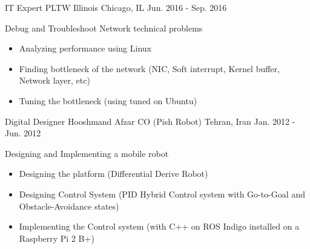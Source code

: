 

\begin{cventries}

  \cventry
    {IT Expert} %
    {PLTW Illinois} %
    {Chicago, IL} %
    {Jun. 2016 - Sep. 2016} %
    {
      \begin{cvitems} %
        \item Debug and Troubleshoot Network technical problems
        \begin{itemize}
        		\item Analyzing performance using Linux
        		\item Finding bottleneck of the network (NIC, Soft interrupt, Kernel buffer, Network layer, etc)
        		\item Tuning the bottleneck (using tuned on Ubuntu)
        \end{itemize}
      \end{cvitems}
    }
    
  \cventry
    {Digital Designer} %
    {Hooshmand Afzar CO (Pish Robot)} %
    {Tehran, Iran} %
    {Jan. 2012 - Jun. 2012} %
    {
      \begin{cvitems} %
        \item Designing and Implementing a mobile robot
        \begin{itemize}
        		\item Designing the platform (Differential Derive Robot)
        		\item Designing Control System (PID Hybrid Control system with Go-to-Goal and Obstacle-Avoidance states)
        		\item Implementing the Control system (with C++ on ROS Indigo installed on a Raspberry Pi 2 B+)
        \end{itemize}
      \end{cvitems}
    }    
    
    
    

\end{cventries}

